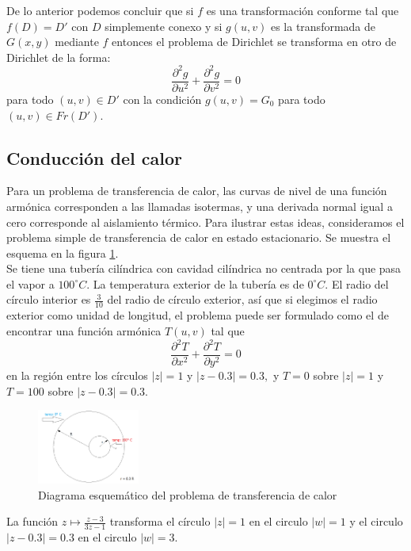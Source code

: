 \documentclass[a4paper]{article}
\begin{document}
De lo anterior podemos concluir que si $f$ es una transformación conforme tal que $f(D)=D'$ con $D$ simplemente conexo y si $g(u,v)$ es la transformada de $G(x,y)$ mediante $f$ entonces el problema de Dirichlet se transforma en otro de Dirichlet de la forma:$$
\frac{\partial ^{2}g}{\partial u^{2}}+\frac{\partial ^{2}g}{\partial v^{2}}=0
$$ para todo $(u,v)\in D'$ con la condición $g(u,v)=G_{0}$ para todo $(u,v) \in Fr(D').$

\subsection{Conducción del calor}
Para un problema de transferencia de calor, las curvas de nivel de una función armónica corresponden a las llamadas isotermas, y una derivada normal igual a cero corresponde al aislamiento térmico. Para ilustrar estas ideas, consideramos el problema simple de transferencia de calor en estado estacionario. Se muestra el esquema en la figura \ref{fig:res}.\\
Se tiene una tubería cilíndrica con cavidad cilíndrica no centrada por la que pasa el vapor a $100^{\circ} C$. La temperatura exterior de la tubería es de $0^{\circ} C$. El radio del círculo interior es $\frac{3}{10}$ del radio de círculo exterior, así que si elegimos el radio exterior como unidad de longitud, el problema puede ser formulado 
como el de encontrar una función armónica $T(u, v)$ tal que$$
\frac{\partial ^{2}T}{\partial x^{2}} + \frac{\partial ^{2}T}{\partial y^{2}} = 0 $$ en la región entre los círculos $|z|=1$ y $|z-0.3|=0.3,$ y $T=0$ sobre $|z|=1$ y $T=100$ sobre $|z-0.3|=0.3.$

\begin{figure}
\centering
\includegraphics[width=0.3\textwidth]{res.png}
\caption{\label{fig:res} Diagrama esquemático del problema de transferencia de calor}
\end{figure}

La función $z \mapsto \frac{z-3}{3z-1}$ transforma el círculo $|z|=1$ en el circulo $|w|=1$ y el circulo $|z-0.3|=0.3$ en el circulo $|w|=3.$
\end{document}
